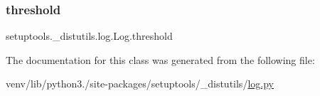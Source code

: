 \subsubsection{\texorpdfstring{threshold}{threshold}}
{\footnotesize\ttfamily setuptools.\+\_\+distutils.\+log.\+Log.\+threshold}



The documentation for this class was generated from the following file\+:\begin{DoxyCompactItemize}
\item 
venv/lib/python3./site-\/packages/setuptools/\+\_\+distutils/\hyperlink{setuptools_2__distutils_2log_8py}{log.\+py}\end{DoxyCompactItemize}
